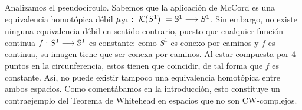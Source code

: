 \begin{example}
  Analizamos el pseudocírculo. Sabemos que la aplicación de McCord es una equivalencia homotópica débil $\mu_{S^1}:\abs{\kcal(S^1)} = \mathbb{S}^1 \lra S^1 $. Sin embargo, no existe ninguna equivalencia débil en sentido contrario, puesto que cualquier función continua $ f:S^1\lra \mathbb{S}^1 $ es constante: como $ S^1 $ es conexo por caminos \cite{barmak2011algebraic} y $ f $ es continua, su imagen tiene que ser conexa por caminos. Al estar compuesta por $ 4 $ puntos en la circunferencia, estos tienen que coincidir, de tal forma que $ f $ es constante. Así, no puede existir tampoco una equivalencia homotópica entre ambos espacios. Como comentábamos en la introducción, esto constituye un contraejemplo del Teorema de Whitehead en espacios que no son CW-complejos.

\begin{figure}[h]
    \centering

\begin{tikzpicture}[x=0.75pt,y=0.75pt,yscale=-1,xscale=1]


\end{tikzpicture}
\end{figure}
\end{example}
